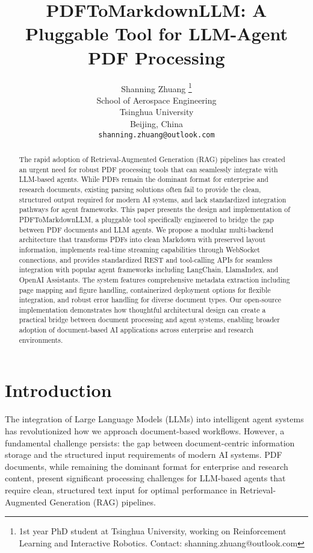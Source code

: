 \documentclass{article}
\title{PDFToMarkdownLLM: A Pluggable Tool for LLM-Agent PDF Processing}
\author{%
  Shanning Zhuang \thanks{1st year PhD student at Tsinghua University, working on Reinforcement Learning and Interactive Robotics. Contact: shanning.zhuang@outlook.com} \\
  School of Aerospace Engineering\\
  Tsinghua University\\
  Beijing, China \\
  \texttt{shanning.zhuang@outlook.com} \\
}
\begin{document}
\maketitle


\begin{abstract}
The rapid adoption of Retrieval-Augmented Generation (RAG) pipelines has created an urgent need for robust PDF processing tools that can seamlessly integrate with LLM-based agents. While PDFs remain the dominant format for enterprise and research documents, existing parsing solutions often fail to provide the clean, structured output required for modern AI systems, and lack standardized integration pathways for agent frameworks. This paper presents the design and implementation of PDFToMarkdownLLM, a pluggable tool specifically engineered to bridge the gap between PDF documents and LLM agents. We propose a modular multi-backend architecture that transforms PDFs into clean Markdown with preserved layout information, implements real-time streaming capabilities through WebSocket connections, and provides standardized REST and tool-calling APIs for seamless integration with popular agent frameworks including LangChain, LlamaIndex, and OpenAI Assistants. The system features comprehensive metadata extraction including page mapping and figure handling, containerized deployment options for flexible integration, and robust error handling for diverse document types. Our open-source implementation demonstrates how thoughtful architectural design can create a practical bridge between document processing and agent systems, enabling broader adoption of document-based AI applications across enterprise and research environments.
\end{abstract}

\section{Introduction}

The integration of Large Language Models (LLMs) into intelligent agent systems has revolutionized how we approach document-based workflows. However, a fundamental challenge persists: the gap between document-centric information storage and the structured input requirements of modern AI systems. PDF documents, while remaining the dominant format for enterprise and research content, present significant processing challenges for LLM-based agents that require clean, structured text input for optimal performance in Retrieval-Augmented Generation (RAG) pipelines.
\end{document}
